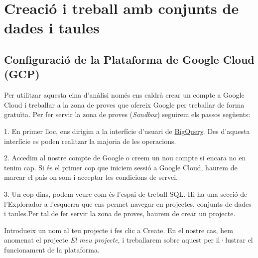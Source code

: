 \documentclass[12pt,longbibliography]{article}
\theoremstyle{definition}
\theoremstyle{remark}
\begin{document}
\pagebreak

\section{Creació i treball amb conjunts de dades i taules}

\subsection{Configuració de la Plataforma de Google Cloud (GCP)}

\graphicspath{ {BigQuery/Imatges tutorial/} }

Per utilitzar aquesta eina d’anàlisi només ens caldrà crear un compte a Google Cloud i treballar a la zona de proves que ofereix Google per treballar de forma gratuïta.
Per fer servir la zona de proves (\textit{Sandbox}) seguirem els passos següents: 

1. En primer lloc, ens dirigim a la interfície d’usuari de \href{https://console.cloud.google.com}{BigQuery}. Des d'aquesta interfície es poden realitzar la majoria de les operacions.

2. Accedim al nostre compte de Google o creem un nou compte si encara no en tenim cap. Si és el primer cop que iniciem sessió a Google Cloud, haurem de marcar el país on som i acceptar les condicions de servei.

3. Un cop dins, podem veure com és l'espai de treball SQL. Hi ha una secció de l'Explorador a l'esquerra que ens permet navegar en projectes, conjunts de dades i taules.Per tal de fer servir la zona de proves, haurem de crear un projecte.

Introdueix un nom al teu projecte i fes clic a Create. En el nostre cas, hem anomenat el projecte \textit{El meu projecte}, i treballarem sobre aquest per il·lustrar el funcionament de la plataforma.

\par
{}%
\hfill
{}%
\par
\end{document}
